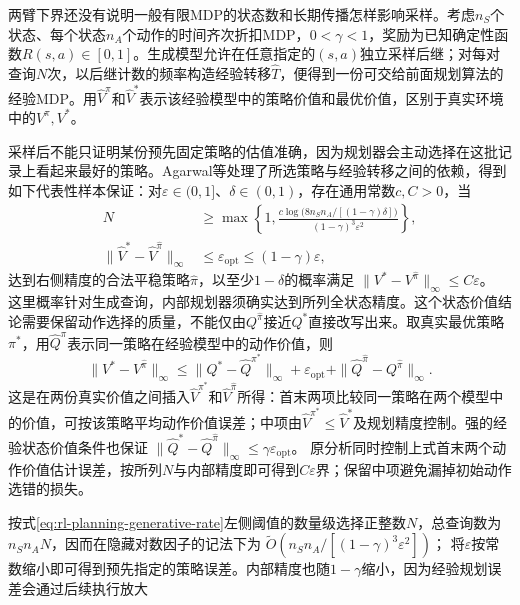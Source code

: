两臂下界还没有说明一般有限MDP的状态数和长期传播怎样影响采样。考虑$n_S$个状态、每个状态$n_A$个动作的时间齐次折扣MDP，$0<\gamma<1$，奖励为已知确定性函数$R(s,a)\in[0,1]$。生成模型允许在任意指定的$(s,a)$独立采样后继；对每对查询$N$次，以后继计数的频率构造经验转移$\widehat T$，便得到一份可交给前面规划算法的经验MDP。用$\widehat V^\pi$和$\widehat V^*$表示该经验模型中的策略价值和最优价值，区别于真实环境中的$V^\pi,V^*$。

采样后不能只证明某份预先固定策略的估值准确，因为规划器会主动选择在这批记录上看起来最好的策略。Agarwal等处理了所选策略与经验转移之间的依赖，得到如下代表性样本保证：对$\varepsilon\in(0,1]$、$\delta\in(0,1)$，存在通用常数$c,C>0$，当
\begin{equation}
 \begin{aligned}
 N&\geq\max\left\{1,
   \frac{c\log\!\bigl(8n_Sn_A/[(1-\gamma)\delta]\bigr)}
        {(1-\gamma)^3\varepsilon^2}\right\},\\
 \|\widehat V^*-\widehat V^{\widehat\pi}\|_\infty
      &\leq\varepsilon_{\mathrm{opt}}
       \leq(1-\gamma)\varepsilon,
 \end{aligned}
 \label{eq:rl-planning-generative-rate}
\end{equation}
达到右侧精度的合法平稳策略$\widehat\pi$，以至少$1-\delta$的概率满足
$\|V^*-V^{\widehat\pi}\|_\infty\leq C\varepsilon$。
这里概率针对生成查询，内部规划器须确实达到所列全状态精度。这个状态价值结论需要保留动作选择的质量，不能仅由$Q^{\widehat\pi}$接近$Q^*$直接改写出来。取真实最优策略$\pi^*$，用$\widehat Q^\pi$表示同一策略在经验模型中的动作价值，则
\[
 \|V^*-V^{\widehat\pi}\|_\infty
 \leq \|Q^*-\widehat Q^{\pi^*}\|_\infty
       +\varepsilon_{\mathrm{opt}}
       +\|\widehat Q^{\widehat\pi}-Q^{\widehat\pi}\|_\infty.
\]
这是在两份真实价值之间插入$\widehat V^{\pi^*}$和$\widehat V^{\widehat\pi}$所得：首末两项比较同一策略在两个模型中的价值，可按该策略平均动作价值误差；中项由$\widehat V^{\pi^*}\leq\widehat V^*$及规划精度控制。强的经验状态价值条件也保证
$\|\widehat Q^*-\widehat Q^{\widehat\pi}\|_\infty
\leq\gamma\varepsilon_{\mathrm{opt}}$。
原分析同时控制上式首末两个动作价值估计误差，按所列$N$与内部精度即可得到$C\varepsilon$界；保留中项避免漏掉初始动作选错的损失。

按式\eqref{eq:rl-planning-generative-rate}左侧阈值的数量级选择正整数$N$，总查询数为$n_Sn_AN$，因而在隐藏对数因子的记法下为
$\widetilde O\!\left(n_Sn_A/[(1-\gamma)^3\varepsilon^2]\right)$；
将$\varepsilon$按常数缩小即可得到预先指定的策略误差。内部精度也随$1-\gamma$缩小，因为经验规划误差会通过后续执行放大

